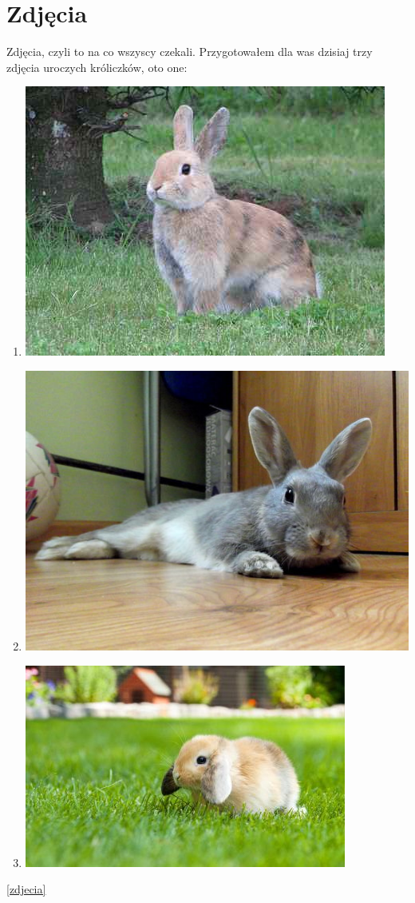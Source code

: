 \documentclass{article}
\begin{document}
\section{Zdjęcia}

Zdjęcia, czyli to na co wszyscy czekali. Przygotowałem dla was dzisiaj trzy zdjęcia uroczych króliczków, oto one:

\begin{enumerate}

\item \includegraphics{krolik1}
\item \includegraphics{krolik2}
\item \includegraphics{krolik3}

\end{enumerate}
\ref{zdjecia}
\end{document}

